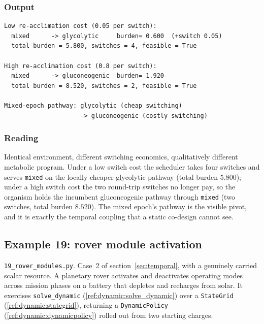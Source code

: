 \documentclass[11pt,a4paper]{article}
\begin{document}
\subsubsection*{Output}
\begin{lstlisting}[language={},numbers=none,keywordstyle={}]
Low re-acclimation cost (0.05 per switch):
  mixed      -> glycolytic     burden= 0.600  (+switch 0.05)
  total burden = 5.800, switches = 4, feasible = True

High re-acclimation cost (0.8 per switch):
  mixed      -> gluconeogenic  burden= 1.920
  total burden = 8.520, switches = 2, feasible = True

Mixed-epoch pathway: glycolytic (cheap switching)
                     -> gluconeogenic (costly switching)
\end{lstlisting}

\subsubsection*{Reading}
Identical environment, different switching economics, qualitatively
different metabolic program. Under a low switch cost the scheduler takes
four switches and serves \texttt{mixed} on the locally cheaper glycolytic
pathway (total burden $5.800$); under a high switch cost the two round-trip
switches no longer pay, so the organism holds the incumbent gluconeogenic
pathway through \texttt{mixed} (two switches, total burden $8.520$). The
mixed epoch's pathway is the visible pivot, and it is exactly the temporal
coupling that a static co-design cannot see.

\subsection{Example 19: rover module activation}
\label{ex:19}

\texttt{19\_rover\_modules.py}. Case~2 of section~\ref{sec:temporal}, with
a genuinely carried scalar resource. A planetary rover activates and
deactivates operating modes across mission phases on a battery that
depletes and recharges from solar. It exercises \texttt{solve\_dynamic}
(\ref{ref:dynamic:solve_dynamic}) over a \texttt{StateGrid}
(\ref{ref:dynamic:stategrid}), returning a \texttt{DynamicPolicy}
(\ref{ref:dynamic:dynamicpolicy}) rolled out from two starting charges.
\end{document}
